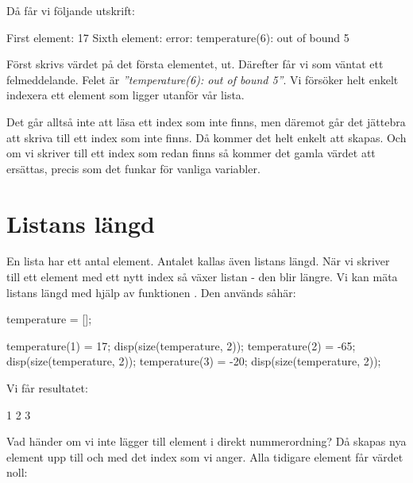 Då får vi följande utskrift:

\vspace{10pt}
\begin{matlab}
First element:
 17
Sixth element:
error: temperature(6): out of bound 5
\end{matlab}

Först skrivs värdet på det första elementet,  ut. Därefter får vi som väntat ett felmeddelande. Felet är \emph{''temperature(6): out of bound 5''}. Vi försöker helt enkelt indexera ett element som ligger utanför vår lista.

Det går alltså inte att läsa ett index som inte finns, men däremot går det jättebra att skriva till ett index som inte finns. Då kommer det helt enkelt att skapas. Och om vi skriver till ett index som redan finns så kommer det gamla värdet att ersättas, precis som det funkar för vanliga variabler.

\section{Listans längd}

En lista har ett antal element. Antalet kallas även listans längd. När vi skriver till ett element med ett nytt index så växer listan - den blir längre. Vi kan mäta listans längd med hjälp av funktionen . Den används såhär:

\begin{matlab}[caption={Listans längd},label={}]
temperature = [];

temperature(1) = 17;
disp(size(temperature, 2));
temperature(2) = -65;
disp(size(temperature, 2));
temperature(3) = -20;
disp(size(temperature, 2));
\end{matlab}

Vi får resultatet:

\vspace{10pt}
\begin{matlab}
 1
 2
 3
\end{matlab}


Vad händer om vi inte lägger till element i direkt nummerordning? Då skapas nya element upp till och med det index som vi anger. Alla tidigare element får värdet noll:

